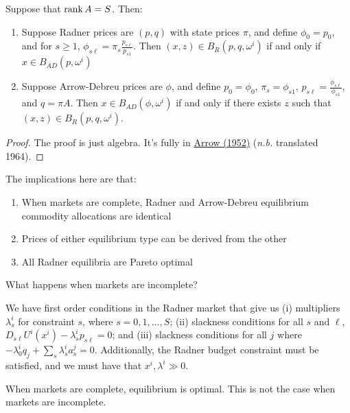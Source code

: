 \documentclass[10pt]{article}
\begin{document}
\begin{theorem} 
	Suppose that $\mathop{\rm rank} A = S$. Then:
	\begin{enumerate}
		\item Suppose Radner prices are $(p,q)$ with state prices $\pi$, and define $\phi_0 = p_0$, and for $s \ge 1$, $\phi_{s\ell} = \pi_s \frac{p_{s\ell}}{p_{s1}}$. Then $(x,z) \in B_R(p,q,\omega^i)$ if and only if $x \in B_{AD}(p,\omega^i)$
		\item Suppose Arrow-Debreu prices are $\phi$, and define $p_0 = \phi_0$, $\pi_s = \phi_{s1}$, $p_{s\ell} = \frac{\phi_{s\ell}}{\phi_{s1}}$, and $q = \pi A$. Then $x \in B_{AD}(\phi,\omega^i)$ if and only if there exists $z$ such that $(x,z) \in B_R(p,q,\omega^i)$. 
	\end{enumerate}
\end{theorem}
\begin{proof}
	The proof is just algebra. It's fully in \href{https://www.jstor.org/stable/2296188?seq=1}{Arrow (1952)} (\emph{n.b.} translated 1964).
\end{proof}

\begin{remark}
	The implications here are that:
	\begin{enumerate}
		\item When markets are complete, Radner and Arrow-Debreu equilibrium commodity allocations are identical
		\item Prices of either equilibrium type can be derived from the other
		\item All Radner equilibria are Pareto optimal
	\end{enumerate}
\end{remark}

\begin{question}
	What happens when markets are incomplete?
\end{question}

We have first order conditions in the Radner market that give us (i) multipliers $\lambda_s^i$ for constraint $s$, where $s = 0,1,\dots,S$; (ii) slackness conditions for all $s$ and $\ell$, $D_{s\ell} U^i(x^i) - \lambda_s^i p_{s\ell} = 0$; and (iii) slackness conditions for all $j$ where $-\lambda_0^i q_j+\sum_s \lambda_s^i a_s^j = 0$. Additionally, the Radner budget constraint must be satisfied, and we must have that $x^i,\lambda^i \gg 0$.

When markets are complete, equilibrium is optimal. This is not the case when markets are incomplete. 
\end{document}
